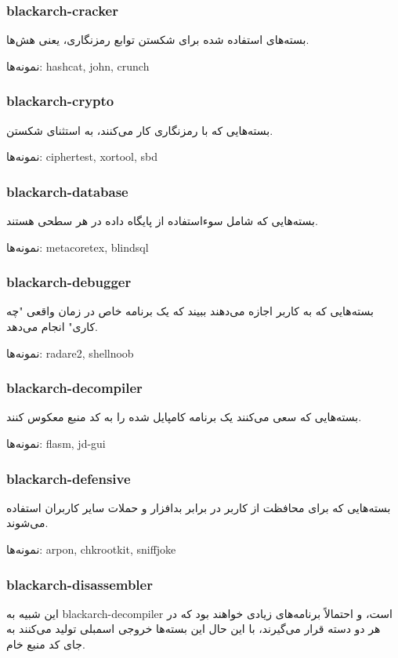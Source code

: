 \documentclass[a4paper, oneside, 11pt]{book}
\begin{document}
\subsubsection{blackarch-cracker}
بسته‌های استفاده شده برای شکستن توابع رمزنگاری، یعنی هش‌ها.

نمونه‌ها: hashcat, john, crunch

\subsubsection{blackarch-crypto}
بسته‌هایی که با رمزنگاری کار می‌کنند، به استثنای شکستن.

نمونه‌ها: ciphertest, xortool, sbd

\subsubsection{blackarch-database}
بسته‌هایی که شامل سوءاستفاده از پایگاه داده در هر سطحی هستند.

نمونه‌ها: metacoretex, blindsql

\subsubsection{blackarch-debugger}
بسته‌هایی که به کاربر اجازه می‌دهند ببیند که یک برنامه خاص در زمان واقعی "چه کاری" انجام می‌دهد.

نمونه‌ها: radare2, shellnoob

\subsubsection{blackarch-decompiler}
بسته‌هایی که سعی می‌کنند یک برنامه کامپایل شده را به کد منبع معکوس کنند.

نمونه‌ها: flasm, jd-gui

\subsubsection{blackarch-defensive}
بسته‌هایی که برای محافظت از کاربر در برابر بدافزار و حملات سایر کاربران استفاده می‌شوند.

نمونه‌ها: arpon, chkrootkit, sniffjoke

\subsubsection{blackarch-disassembler}
این شبیه به blackarch-decompiler است، و احتمالاً برنامه‌های زیادی خواهند بود
که در هر دو دسته قرار می‌گیرند، با این حال این بسته‌ها خروجی اسمبلی تولید می‌کنند
به جای کد منبع خام.
\end{document}
